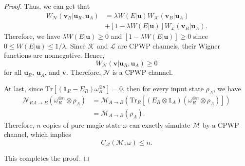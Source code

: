 \documentclass[10pt,a4paper]{amsart}
\begin{document}
\begin{proof}
	Thus, we can get that
	\begin{equation}
		\begin{aligned}
			W_{\mathcal{N}}(\mathbf{v}_B|\mathbf{u}_R,\mathbf{u}_A) &= \lambda W(E|\mathbf{u}) W_{\mathcal{K}}(\mathbf{v}_B|\mathbf{u}_A) \\ &+ [1-\lambda W(E|\mathbf{u})]W_{\mathcal{L}}(\mathbf{v}_B|\mathbf{u}_A).
		\end{aligned}
	\end{equation}
	Therefore, we have $\lambda W(E|\mathbf{u}) \geqslant 0$ and $[1-\lambda W(E|\mathbf{u})] \geqslant 0$ since $0 \leqslant W(E|\mathbf{u}) \leqslant 1/\lambda$.
	Since $\mathcal{K}$ and $\mathcal{L}$ are CPWP channels, their Wigner functions are nonnegative. 
	Hence,
	\begin{equation}
		W_{\mathcal{N}} (\mathbf{v}|\mathbf{u}_R,\mathbf{u}_A) \geqslant 0
	\end{equation}
	for all $\mathbf{u}_R$, $\mathbf{u}_A$, and $\mathbf{v}$. 
	Therefore, $\mathcal{N}$ is a CPWP channel.
	
	At last, since $\mathrm{Tr}\left[(\mathds{1}_R-E_R)\omega_R^{\otimes n}\right]=0$, then for every input state $\rho_A$, we have
	\begin{equation}
		\begin{aligned}
			\mathcal{N}_{RA\rightarrow B}\left(\omega_R^{\otimes n}\otimes\rho_A\right) &= \mathcal{M}_{A\rightarrow B}\left( \mathrm{Tr}_R\left[(E_R\otimes\mathds{1}_A)(\omega_R^{\otimes n}\otimes\rho_A)\right]\right) \\ &= \mathcal{M}_{A\rightarrow B}(\rho_A).
		\end{aligned}
	\end{equation}
	Therefore, $n$ copies of pure magic state $\omega$ can exactly simulate $\mathcal{M}$ by a CPWP channel, which implies
	\begin{equation}
		C_{\mathcal{A}}(\mathcal{M};\omega) \leqslant n.
	\end{equation}
	
	This completes the proof.
\end{proof}
\end{document}
